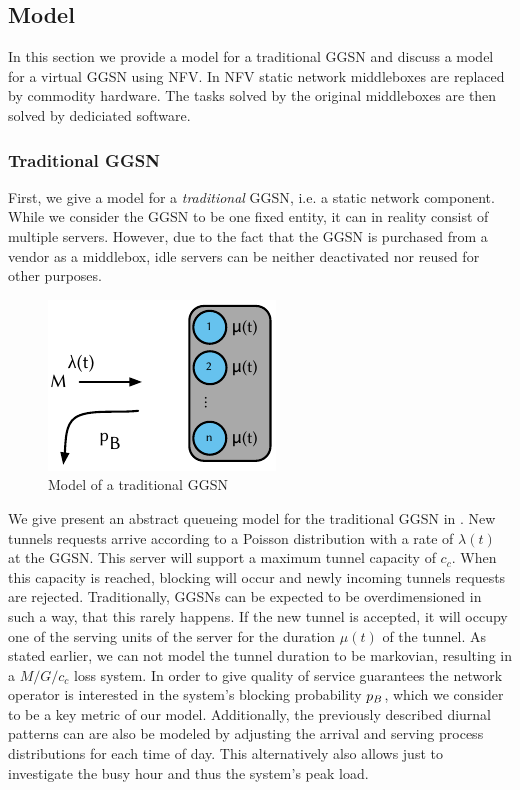 \subsection{Model}\label{sec:cloud:virtualized_network_functions:model}

In this section we provide a model for a traditional \gls{GGSN} and discuss a model for a virtual \gls{GGSN} using \gls{NFV}.
In \gls{NFV} \cite{Nfv2013} static network middleboxes are replaced by commodity hardware.
The tasks solved by the original middleboxes are then solved by dediciated software.

\subsubsection*{Traditional GGSN}\label{sec:cloud:virtualized_network_functions:model:traditional_ggsn}
First, we give a model for a \emph{traditional} \gls{GGSN}, i.e. a static network component.
While we consider the \gls{GGSN} to be one fixed entity, it can in reality consist of multiple servers.
However, due to the fact that the \gls{GGSN} is purchased from a vendor as a middlebox, idle servers can be neither deactivated nor reused for other purposes.

\begin{figure}
  \centering
  \includegraphics{cloud/virtualized_network_functions/model/figures/traditional_ggsn}
  \caption{Model of a traditional GGSN}
  \label{sec:cloud:virtualized_network_functions:model:traditional_ggsn:model}
\end{figure}

We give present an abstract queueing model for the traditional \gls{GGSN} in .
New tunnels requests arrive according to a Poisson distribution with a rate of \(\lambda(t)\) at the \gls{GGSN}.
This server will support a maximum tunnel capacity of \(c_c\).
When this capacity is reached, blocking will occur and newly incoming tunnels requests are rejected.
Traditionally, \glspl{GGSN} can be expected to be overdimensioned in such a way, that this rarely happens.
If the new tunnel is accepted, it will occupy one of the serving units of the server for the duration \(\mu(t)\) of the tunnel.
As stated earlier, we can not model the tunnel duration to be markovian, resulting in a  \(M/G/c_c\) loss system.
In order to give quality of service guarantees the network operator is interested in the system's blocking probability \(p_B\), which we consider to be a key metric of our model.
Additionally, the previously described diurnal patterns can are also be modeled by adjusting the arrival and serving process distributions for each time of day.
This alternatively also allows just to investigate the busy hour and thus the system's peak load.

